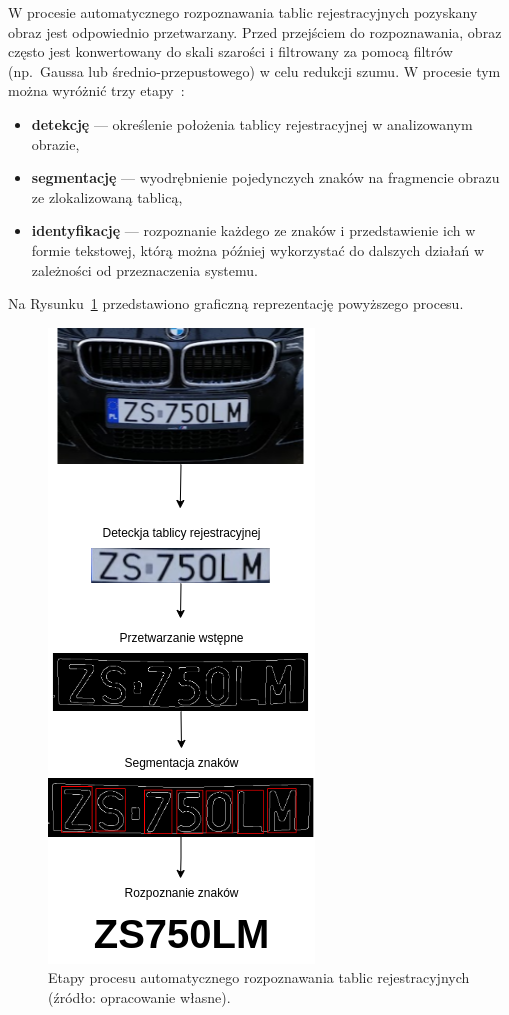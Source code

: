 W procesie automatycznego rozpoznawania tablic rejestracyjnych pozyskany obraz jest odpowiednio przetwarzany.
Przed przejściem do rozpoznawania, obraz często jest konwertowany do skali szarości i filtrowany za pomocą filtrów (np.\ Gaussa lub średnio-przepustowego) w celu redukcji szumu.
W procesie tym można wyróżnić trzy etapy~\cite{1688109}:
\begin{itemize}
    \item \textbf{detekcję} --- określenie położenia tablicy rejestracyjnej w analizowanym obrazie,
    \item \textbf{segmentację} --- wyodrębnienie pojedynczych znaków na fragmencie obrazu ze zlokalizowaną tablicą,
    \item \textbf{identyfikację} --- rozpoznanie każdego ze znaków i przedstawienie ich w formie tekstowej, którą można później wykorzystać do dalszych działań w zależności od przeznaczenia systemu.
\end{itemize}
\FloatBarrier
Na Rysunku~\ref{fig:schemat_lpr} przedstawiono graficzną reprezentację powyższego procesu.
\begin{figure}[!ht]
    \centering
    \includegraphics[scale=0.6]{Pictures/schemat_lpr}
    \caption{Etapy procesu automatycznego rozpoznawania tablic rejestracyjnych (źródło: opracowanie własne).}
    \label{fig:schemat_lpr}
\end{figure}
